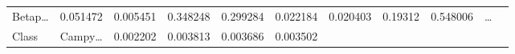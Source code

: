 \documentclass[
]{article}
\begin{document}
\begin{longtable}[]{@{}lllllllllll@{}}
\begin{minipage}[t]{0.06\columnwidth}
Betap\ldots{}\strut
\end{minipage} & \begin{minipage}[t]{0.09\columnwidth}\raggedright
0.051472\strut
\end{minipage} & \begin{minipage}[t]{0.06\columnwidth}\raggedright
0.005451\strut
\end{minipage} & \begin{minipage}[t]{0.09\columnwidth}\raggedright
0.348248\strut
\end{minipage} & \begin{minipage}[t]{0.06\columnwidth}\raggedright
0.299284\strut
\end{minipage} & \begin{minipage}[t]{0.09\columnwidth}\raggedright
0.022184\strut
\end{minipage} & \begin{minipage}[t]{0.06\columnwidth}\raggedright
0.020403\strut
\end{minipage} & \begin{minipage}[t]{0.06\columnwidth}\raggedright
0.19312\strut
\end{minipage} & \begin{minipage}[t]{0.06\columnwidth}\raggedright
0.548006\strut
\end{minipage} & \begin{minipage}[t]{0.03\columnwidth}\raggedright
\ldots{}\strut
\end{minipage}\tabularnewline
\begin{minipage}[t]{0.06\columnwidth}\raggedright
Class\strut
\end{minipage} & \begin{minipage}[t]{0.06\columnwidth}\raggedright
Campy\ldots{}\strut
\end{minipage} & \begin{minipage}[t]{0.09\columnwidth}\raggedright
0.002202\strut
\end{minipage} & \begin{minipage}[t]{0.06\columnwidth}\raggedright
0.003813\strut
\end{minipage} & \begin{minipage}[t]{0.09\columnwidth}\raggedright
0.003686\strut
\end{minipage} & \begin{minipage}[t]{0.06\columnwidth}\raggedright
0.003502\strut
\end{minipage} & \begin{minipage}[t]{0.09\columnwidth}\raggedright

\end{minipage}
\end{longtable}
\end{document}
